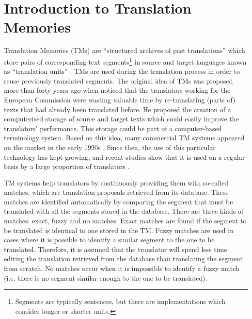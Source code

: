 \chapter{\label{cha:tm_introduction}Introduction to Translation Memories}

Translation Memories (TMs) are ``structured archives of past translations'' which store pairs of corresponding text segments\footnote{Segments are typically sentences, but there are implementations which consider longer or shorter units.} in source and target languages known as ``translation units'' \autocite{Simard2020}. TMs are used during the translation process in order to reuse previously translated segments. The original idea of TMs was proposed more than forty years ago when \textcite{Arthern1979} noticed that the translators working for the European Commission were wasting valuable time by re-translating (parts of) texts that had already been translated before. He proposed the creation of a computerised storage of source and target texts which could easily improve the translators' performance. This storage could be part of a computer-based terminology system. Based on this idea, many commercial TM systems appeared on the market in the early 1990s \autocite{bowker2006lexicography}. Since then, the use of this particular technology has kept growing, and recent studies show that it is used on a regular basis by a large proportion of translators  \autocite{zaretskaya:2018}.

TM systems help translators by continuously providing them with so-called matches, which are translation proposals retrieved from its database. These matches are identified automatically by comparing the segment that must be translated with all the segments stored in the database. There are three kinds of matches: exact, fuzzy and no matches. Exact matches are found if the segment to be translated is identical to one stored in the TM. Fuzzy matches are used in cases where it is possible to identify a similar segment to the one to be translated. Therefore, it is assumed that the translator will spend less time editing the translation retrieved from the database than translating the segment from scratch. No matches occur when it is impossible to identify a fuzzy match (i.e. there is no segment similar enough to the one to be translated).


